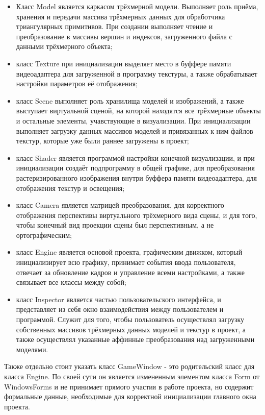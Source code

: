 \begin{itemize}
	\item Класс Model является каркасом трёхмерной модели. Выполняет роль приёма, хранения и передачи массива трёхмерных данных для обработчика триангулярных примитивов. При создании выполняет чтение и преобразование в массивы вершин и индексов, загруженного файла с данными трёхмерного объекта;
	\item класс Texture при инициализации выделяет место в буффере памяти видеоадаптера для загруженной в программу текстуры, а также обрабатывает настройки параметров её отображения;
	\item класс Scene выполняет роль хранилища моделей и изображений, а также выступает виртуальной сценой, на которой находятся все трёхмерные объекты и остальные элементы, учавствующие в визуализации. При инициализации выполняет загрузку данных массивов моделей и привязанных к ним файлов текстур, которые уже были раннее загружены в проект;
	\item класс Shader является программой настройки конечной визуализации, и при инициализации создаёт подпрограмму в общей графике, для преобразования растеризированного изображения внутри буффера памяти видеоадаптера, для отображения текстур и освещения;
	\item класс Camera является матрицей преобразования, для корректного отображения перспективы виртуального трёхмерного вида сцены, и для того, чтобы конечный вид проекции сцены был перспективным, а не ортографическим;
	\item класс Engine является основой проекта, графическим движком, который инициализирует всю графику, принимает события ввода пользователя, отвечает за обновление кадров и управление всеми настройками, а также связывает все классы между собой;
	\item класс Inspector является частью пользовательского интерфейса, и представляет из себя окно взаимодействия между пользователем и программой. Служит для того, чтобы пользователь осуществлял загрузку собственных массивов трёхмерных данных моделей и текстур в проект, а также осуществлял указанные аффинные преобразования над загруженными моделями.
\end{itemize}

Также отдельно стоит указать класс GameWindow - это родительский класс для класса Engine. По своей сути он является измененным элементом класса Form от WindowsForms и не принимает прямого участия в работе проекта, но содержит формальные данные, необходимые для корректной инициализации главного окна проекта.

